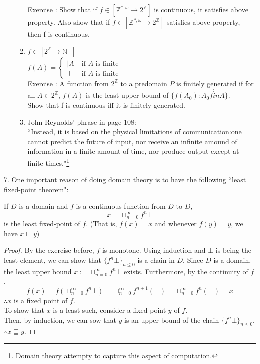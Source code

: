 \documentclass{report}[12pt]
\begin{document}
\begin{enumerate}
\begin{enumerate}
        Exercise : Show that if $f\in [\mathbb{Z}^{*, \omega} \rightarrow 2^{\mathbb{Z}}]$ is continuous, it satisfies above property. Also show that if $f\in [\mathbb{Z}^{*, \omega} \rightarrow 2^{\mathbb{Z}}]$ satisfies above property, then f is continuous.
        \item $f\in [2^\mathbb{Z} \rightarrow \mathbb{N}^\top]$ \\
        $f(A) = \begin{cases}
            |A| & \text{if }A \text{ is finite} \\
            \top & \text{if }A \text{ is finite}
        \end{cases}$ \\
        Exercise : A function from $2^\mathbb{Z}$ to a predomain $P$ is finitely generated if for all $A\in 2^\mathbb{Z}$, $f(A)$ is the least upper bound of $\{f(A_0):A_0 \stackrel{\subset}{fin} A\}$. \\
        Show that f is continuous iff it is finitely generated.
        \item John Reynolds' phrase in page 108:\\
        ``Instead, it is based on the physical limitations of communication:one cannot predict the future of input, nor receive an infinite amound of information in a finite amount of time, nor produce output except at finite times."\footnote{Domain theory attempty to capture this aspect of computation.}
    \end{enumerate}
\end{enumerate}
7. One important reason of doing domain theory is to have the following ``least fixed-point theorem":
\begin{proposition}
    If $D$ is a domain and $f$ is a continuous function from $D$ to $D$, \[x=\sqcup_{n=0}^\infty f^n \bot\]
    is the least fixed-point of $f$. (That is, $f(x)=x$ and whenever $f(y)=y$, we have $x\sqsubseteq y$)
\end{proposition}
\begin{proof}
    By the exercise before, $f$ is monotone. Using induction and $\bot$ is being the least element, we can show that $\{f^n \bot\}_{n\le 0}$ is a chain in $D$. Since $D$ is a domain, the least upper bound $x:=\sqcup_{n=0}^\infty f^n \bot$ exists. Furthermore, by the continuity of $f$,
    \[f(x) = f(\sqcup_{n=0}^\infty f^n \bot) = \sqcup_{n=0}^\infty f^{n+1}(\bot) = \sqcup_{n=0}^\infty f^n(\bot) = x\]
    $\therefore x$ is a fixed point of $f$. \\
    To show that $x$ is a least such, consider a fixed point $y$ of $f$. \\
    Then, by induction, we can sow that $y$ is an upper bound of the chain $\{f^n \bot\}_{n\le 0}$. $\therefore x\sqsubseteq y$.
\end{proof}
\end{document}
